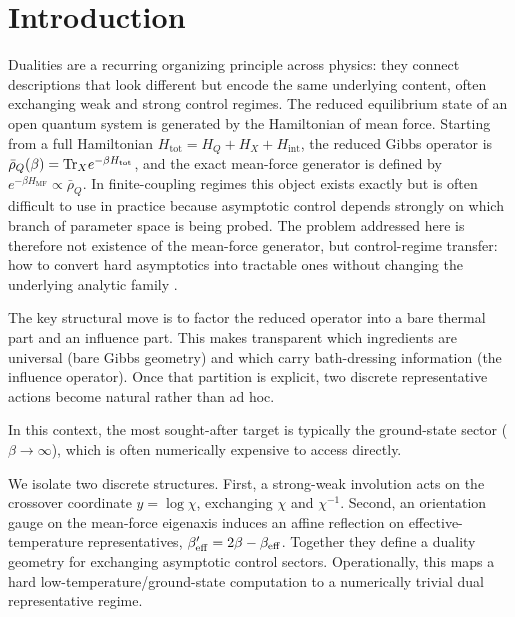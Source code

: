 \section{Introduction}
\label{sec:introduction}

Dualities are a recurring organizing principle across physics: they connect descriptions that look
different but encode the same underlying content, often exchanging weak and strong control regimes.
The reduced equilibrium state of an open quantum system is generated by the Hamiltonian of mean
force. Starting from a full Hamiltonian
\(H_{\mathrm{tot}} = H_Q + H_X + H_{\mathrm{int}}\), the reduced Gibbs operator is
\(\bar{\rho}_Q(\beta)=\mathrm{Tr}_X e^{-\beta H_{\mathrm{tot}}}\), and the exact mean-force generator is
defined by \(e^{-\beta H_{\mathrm{MF}}}\propto \bar{\rho}_Q\). In finite-coupling regimes this
object exists exactly but is often difficult to use in practice because asymptotic control depends
strongly on which branch of parameter space is being probed. The problem addressed here is therefore
not existence of the mean-force generator, but control-regime transfer: how to convert hard
asymptotics into tractable ones without changing the underlying analytic family
\cite{gelinThermodynamicsSubensembleCanonical2009a,hiltHamiltonianMeanForce2011,talknerColloquiumStatisticalMechanics2020,rivasStrongCouplingThermodynamics2020,burkeStructureHamiltonianMean2024,jarzynskiNonequilibriumWorkTheorem2004,campisiFluctuationTheoremArbitrary2009,trushechkinOpenQuantumSystem2022}.

The key structural move is to factor the reduced operator into a bare thermal part and an influence
part. This makes transparent which ingredients are universal (bare Gibbs geometry) and which carry
bath-dressing information (the influence operator). Once that partition is explicit, two discrete
representative actions become natural rather than ad hoc.

In this context, the most sought-after target is typically the ground-state sector
(\(\beta\to\infty\)), which is often numerically expensive to access directly.

We isolate two discrete structures. First, a strong-weak involution acts on the crossover coordinate
\(y=\log\chi\), exchanging \(\chi\) and \(\chi^{-1}\). Second, an orientation gauge on the
mean-force eigenaxis induces an affine reflection on effective-temperature representatives,
\(\beta_{\mathrm{eff}}' = 2\beta-\beta_{\mathrm{eff}}\). Together they define a duality geometry for exchanging asymptotic
control sectors. Operationally, this maps a hard low-temperature/ground-state computation to a
numerically trivial dual representative regime.

